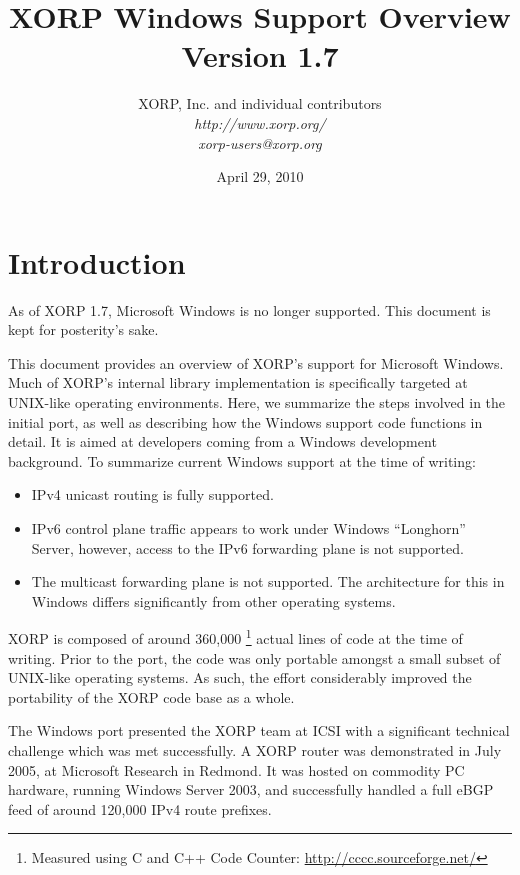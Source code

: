 \documentclass[11pt]{article}
\begin{document}
\title{XORP Windows Support Overview \\
\vspace{1ex}
Version 1.7}
\author{ XORP, Inc. and individual contributors		\\
         {\it http://www.xorp.org/}			\\
	 {\it xorp-users@xorp.org}
}
\date{April 29, 2010}

\maketitle


\section{Introduction}

As of XORP 1.7, Microsoft Windows is no longer supported.  This
document is kept for posterity's sake.

This document provides an overview of XORP's support for Microsoft Windows.
Much of XORP's internal library implementation is specifically targeted
at UNIX-like operating environments. Here, we summarize the steps involved
in the initial port, as well as describing how the Windows support code
functions in detail. It is aimed at developers coming from a Windows
development background.
To summarize current Windows support at the time of writing:
\begin{itemize}
 \item IPv4 unicast routing is fully supported.
 \item IPv6 control plane traffic appears to work under Windows
``Longhorn'' Server, however, access to the IPv6 forwarding plane
is not supported.
 \item The multicast forwarding plane is not supported. The architecture
for this in Windows differs significantly from other operating systems.
\end{itemize}

XORP is composed of around 360,000
\footnote{Measured using C and C++ Code Counter: \url{http://cccc.sourceforge.net/}}
actual lines of code at the time of writing.
Prior to the port, the code was only portable amongst
a small subset of UNIX-like operating systems. As such, the effort
considerably improved the portability of the XORP code base as a whole.

The Windows port presented the XORP team at ICSI with a significant technical
challenge which was met successfully.
A XORP router  was
demonstrated in July 2005, at Microsoft Research in Redmond.
It was hosted on commodity PC hardware, running Windows Server 2003,
and successfully handled a full eBGP feed of around 120,000 IPv4 route prefixes.
\end{document}
